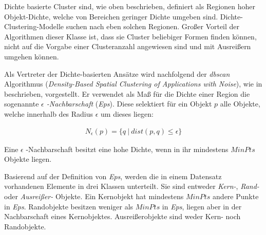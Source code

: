 Dichte basierte Cluster sind, wie oben beschrieben, definiert als Regionen hoher Objekt-Dichte, welche
von Bereichen geringer Dichte umgeben sind. Dichte-Clustering-Modelle suchen nach eben solchen Regionen.
Großer Vorteil der Algorithmen dieser Klasse ist, dass sie Cluster beliebiger Formen finden können,
nicht auf die Vorgabe einer Clusteranzahl angewiesen sind und mit Ausreißern umgehen können.

Als Vertreter der Dichte-basierten Ansätze wird nachfolgend der \textit{\acrshort*{dbscan}} Algorithmus
(\textit{Density-Based Spatial Clustering of Applications with Noise}), wie in \cite[]{Gao2012} beschrieben, vorgestellt.
Er verwendet als Maß für die Dichte einer Region die sogenannte \textit{$\epsilon$ -Nachbarschaft} (\textit{Eps}).
Diese selektiert für ein Objekt $p$ alle Objekte, welche innerhalb des Radius $\epsilon$ um dieses liegen:

\begin{ceqn}
\begin{align}
    \label{eq_dbscan_1}
    N_{\epsilon}(p) = \{ q\ |\ dist(p,q) \leq \epsilon \}
\end{align}
\end{ceqn}

Eine $\epsilon$ -Nachbarschaft besitzt eine hohe Dichte, wenn in ihr mindestens $MinPts$ Objekte liegen.

Basierend auf der Definition von \textit{Eps}, werden die in einem Datensatz vorhandenen Elemente in
drei Klassen unterteilt. Sie sind entweder \textit{Kern-}, \textit{Rand-} oder \textit{Ausreißer-} Objekte.
Ein Kernobjekt hat mindestens $MinPts$ andere Punkte in \textit{Eps}.
Randobjekte besitzen weniger als $MinPts$ in \textit{Eps}, liegen aber in der Nachbarschaft eines Kernobjektes.
Ausreißerobjekte sind weder Kern- noch Randobjekte.

